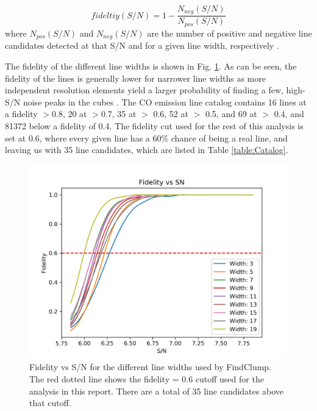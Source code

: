 $$ fideltiy(S/N) = 1 - \frac{N_{neg}(S/N)}{N_{pos}(S/N)} $$ where $N_{pos}(S/N)$ and $N_{neg}(S/N)$ are the number of positive and negative line candidates detected at that S/N and for a given line width, respectively \cite{gonzalez2019alma}. %

The fidelity of the different line widths is shown in Fig. \ref{fig:Fid_map}. As can be seen, the fidelity of the lines is generally lower for narrower line widths as more independent resolution elements yield a larger probability of finding a few, high-S/N noise peaks in the cubes \cite{decarli2019alma}. The CO emission line catalog contains 16 lines at a fidelity $>$0.8, 20 at $>$0.7, 35 at $>$ 0.6, 52 at $>$ 0.5, and 69 at $>$ 0.4, and 81372 below a fidelity of 0.4. The fidelity cut used for the rest of this analysis is set at 0.6, where every given line has a 60\% chance of being a real line, and leaving us with 35 line candidates, which are listed in Table \ref{table:Catalog}. %

\begin{figure}[!htbp]
\centering \includegraphics[width=120mm]{Fidelity_map.png}
\caption{Fidelity vs S/N for the different line widths used by FindClump. The red dotted line shows the fidelity = 0.6 cutoff used for the analysis in this report. There are a total of 35 line candidates above that cutoff.}
\label{fig:Fid_map}
\end{figure}

